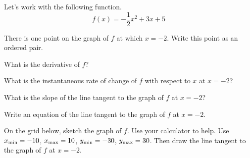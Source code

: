 
Let's work with the following function.
\begin{equation*}
 f(x) = - \frac{1}{2} x^2 + 3x + 5
\end{equation*}
\begin{ProblemSet}
 \begin{Problem}
  There is one point on the graph of $f$ at which $x = -2$.
  Write this point as an ordered pair.
 \end{Problem}
 \begin{Problem}
  What is the derivative of $f$?
 \end{Problem}
 \begin{Problem}
  What is the instantaneous rate of change of $f$ with respect to $x$ at $x = -2$?
 \end{Problem}
 \begin{Problem}
  What is the slope of the line tangent to the graph of $f$ at $x = -2$?
 \end{Problem}
 \begin{Problem}
  Write an equation of the line tangent to the graph of $f$ at $x = -2$.
 \end{Problem}
 \begin{Problem}
  On the grid below, sketch the graph of $f$.
  Use your calculator to help.
  Use $x_\mathrm{min} = -10$, $x_\mathrm{max} = 10$, $y_\mathrm{min} = -30$, $y_\mathrm{max} = 30$.
  Then draw the line tangent to the graph of $f$ at $x = -2$.

  \bigskip
  \GraphingGridMedium
 \end{Problem}
\end{ProblemSet}

